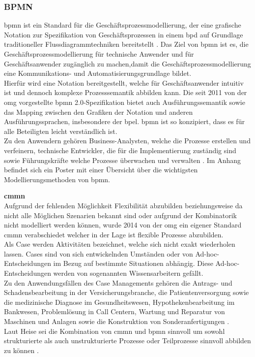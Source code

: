 \documentclass[a4paper, 12pt, twoside, headsepline=true]{scrartcl} %
\begin{document}
\subsubsection{BPMN}\label{bpmngrundlagen}
\ac{bpmn} ist ein Standard für die Geschäftsprozessmodellierung, der eine grafische Notation zur Spezifikation von Geschäftsprozessen in einem \ac{bpd} auf Grundlage traditioneller Flussdiagrammtechniken bereitstellt \cite[S.222]{Aagesen2015}. Das Ziel von \ac{bpmn} ist es, die Geschäftsprozessmodellierung für technische Anwender und für Geschäftsanwender zugänglich zu machen,damit die Geschäftsprozessmodellierung eine Kommunikations- und Automatisierungsgrundlage bildet.\\
 Hierfür wird eine Notation bereitgestellt, welche für Geschäftsanwender intuitiv ist und dennoch komplexe Prozesssemantik abbilden kann. Die seit 2011 von der \ac{omg} vorgestellte \ac{bpmn} 2.0-Spezifikation bietet auch Ausführungssemantik sowie das Mapping zwischen den Grafiken der Notation und anderen Ausführungssprachen, insbesondere der \ac{bpel}. \ac{bpmn} ist so konzipiert, dass es für alle Beteiligten leicht verständlich ist. \\
Zu den Anwendern gehören Business-Analysten, welche die Prozesse erstellen und verfeinern, technische Entwickler, die für die Implementierung zuständig sind sowie Führungskräfte welche Prozesse überwachen und verwalten \cite{vonRosing2015433}. Im Anhang befindet sich ein Poster mit einer Übersicht über die wichtigsten Modellierungsmethoden von \ac{bpmn}. \\
\newline

\textbf{\ac{cmmn}}\\
Aufgrund der fehlenden Möglichkeit Flexibilität abzubilden beziehungsweise da nicht alle Möglichen Szenarien bekannt sind oder aufgrund der Kombinatorik nicht modelliert werden können, wurde 2014 von der \ac{omg} ein eigener Standard \ac{cmmn} verabschiedet welcher in der Lage ist flexible Prozesse abzubilden.\\
 Als Case werden Aktivitäten bezeichnet, welche sich nicht exakt wiederholen lassen. Cases sind von sich entwickelnden Umständen oder von Ad-hoc-Entscheidungen im Bezug auf bestimmte Situationen abhängig. Diese Ad-hoc-Entscheidungen werden von sogenannten Wissensarbeitern gefällt.\\
 Zu den Anwendungsfällen des Case Managements gehören die Antrags- und Schadensbearbeitung in der Versicherungsbranche, die Patientenversorgung sowie die medizinische Diagnose im Gesundheitswesen, Hypothekenbearbeitung im Bankwesen, Problemlösung in Call Centern, Wartung und Reparatur von Maschinen und Anlagen sowie die Konstruktion von Sonderanfertigungen\cite{cmmnomg} . \\
Laut Heise sei die Kombination von \ac{cmmn} und \ac{bpmn} sinnvoll um sowohl strukturierte als auch unstrukturierte Prozesse oder Teilprozesse sinnvoll abbilden zu können \cite{cmmnheise}.
\end{document}
